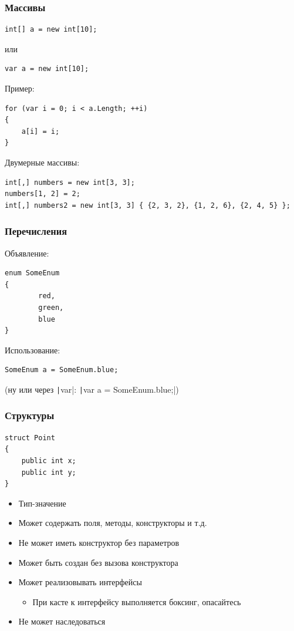 \documentclass[xetex,mathserif,serif]{beamer}
\begin{document}
	\begin{frame}[fragile]
		\frametitle{Массивы}
		\begin{verbatim}
int[] a = new int[10];
		\end{verbatim}
		или
		\begin{verbatim}
var a = new int[10];
		\end{verbatim}
		Пример:
		\begin{verbatim}
for (var i = 0; i < a.Length; ++i)
{
    a[i] = i;
}
		\end{verbatim}
		Двумерные массивы:
		\begin{verbatim}
int[,] numbers = new int[3, 3];
numbers[1, 2] = 2; 
int[,] numbers2 = new int[3, 3] { {2, 3, 2}, {1, 2, 6}, {2, 4, 5} };
		\end{verbatim}
\end{frame}

	\begin{frame}[fragile]
		\frametitle{Перечисления}
		Объявление:
		\begin{verbatim}
enum SomeEnum
{
        red,
        green,
        blue
}
		\end{verbatim}
		Использование:
		\begin{verbatim}
SomeEnum a = SomeEnum.blue;
		\end{verbatim}
		(ну или через \texttt|var|: \texttt|var a = SomeEnum.blue;|)
\end{frame}

	\begin{frame}[fragile]
		\frametitle{Структуры}
		\begin{verbatim}
struct Point
{
    public int x;
    public int y;
}
		\end{verbatim}
		\begin{itemize}
			\item Тип-значение
			\item Может содержать поля, методы, конструкторы и т.д.
			\item Не может иметь конструктор без параметров
			\item Может быть создан без вызова конструктора
			\item Может реализовывать интерфейсы
			\begin{itemize}
				\item При касте к интерфейсу выполняется боксинг, опасайтесь
			\end{itemize}
			\item Не может наследоваться
		\end{itemize}
\end{frame}
\end{document}
